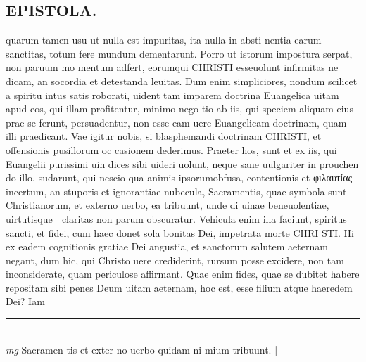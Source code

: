 \documentclass{article}
\begin{document}
\begin{pages}
\section*{EPISTOLA.  }\pstart quarum tamen usu ut nulla est impuritas, ita nulla in absti nentia earum sanctitas, totum fere mundum dementarunt.  Porro ut istorum impostura serpat, non paruum mo mentum adfert, eorumqui CHRISTI esseuolunt infirmitas ne dicam, an socordia et detestanda leuitas.  Dum enim simpliciores, nondum scilicet a spiritu intus satis roborati, uident tam imparem doctrina Euangelica uitam apud eos, qui illam profitentur, minimo nego tio ab iis, qui speciem aliquam eius prae se ferunt, persuadentur, non esse eam uere Euangelicam doctrinam, quam illi praedicant.  Vae igitur nobis, si blasphemandi doctrinam CHRISTI, et offensionis pusillorum oc casionem dederimus.   \pend\pstart Praeter hos, sunt et ex iis, qui Euangelii purissimi uin dices sibi uideri uolunt, neque sane uulgariter in prouchen do illo, sudarunt, qui nescio qua animis ipsorumobfusa, contentionis et φιλαυτίας incertum, an stuporis et ignorantiae nubecula, Sacramentis, quae symbola sunt Christianorum, et externo uerbo, ea tribuunt, unde di uinae beneuolentiae, uirtutisque  claritas non parum obscuratur.  Vehicula enim illa faciunt, spiritus sancti, et fidei, cum haec donet sola bonitas Dei, impetrata morte CHRI STI.  Hi ex eadem cognitionis gratiae Dei angustia, et sanctorum salutem aeternam negant, dum hic, qui Christo uere crediderint, rursum posse excidere, non tam inconsiderate, quam periculose affirmant.  Quae enim fides, quae se dubitet habere repositam sibi penes Deum uitam aeternam, hoc est, esse filium atque haeredem Dei? Iam  \pend
\vspace{0.5cm}\noindent
\vspace{0.2cm}\rule{1cm}{0.2pt}\\ 
\hspace{0.2cm}\textit{mg}
\footnotesize Sacramen tis et exter no uerbo quidam ni mium tribuunt.  
\normalsize| 

\end{pages}
\end{document}
